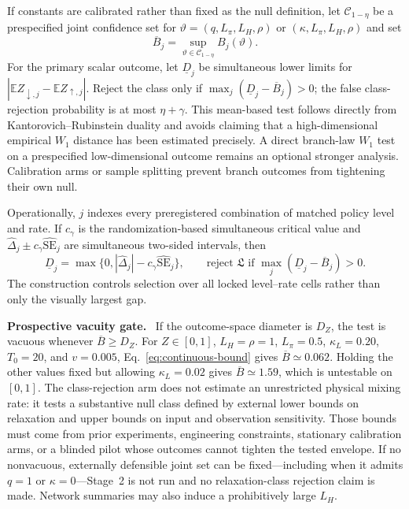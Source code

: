 \documentclass[10pt,a4paper]{article}
\newcommand{\E}{\mathbb{E}}
\newcommand{\inlinehead}[1]{\par\smallskip\noindent\textbf{#1}\ }
\begin{document}
If constants are calibrated rather than fixed as the null definition, let $\mathcal C_{1-\eta}$ be a prespecified joint confidence set for $\vartheta=(q,L_\pi,L_H,\rho)$ or $(\kappa,L_\pi,L_H,\rho)$ and set
\begin{equation}
\overline B_j=\sup_{\vartheta\in\mathcal C_{1-\eta}}B_j(\vartheta).
\label{eq:lag-envelope}
\end{equation}
For the primary scalar outcome, let $\underline D_j$ be simultaneous lower limits for $|\E Z_{\downarrow,j}-\E Z_{\uparrow,j}|$. Reject the class only if $\max_j(\underline D_j-\overline B_j)>0$; the false class-rejection probability is at most $\eta+\gamma$. This mean-based test follows directly from Kantorovich--Rubinstein duality and avoids claiming that a high-dimensional empirical $W_1$ distance has been estimated precisely. A direct branch-law $W_1$ test on a prespecified low-dimensional outcome remains an optional stronger analysis. Calibration arms or sample splitting prevent branch outcomes from tightening their own null.

Operationally, $j$ indexes every preregistered combination of matched policy level and rate. If $c_\gamma$ is the randomization-based simultaneous critical value and $\widehat\Delta_j\pm c_\gamma\widehat{\mathrm{SE}}_j$ are simultaneous two-sided intervals, then
\begin{equation}
\underline D_j=\max\{0,|\widehat\Delta_j|-c_\gamma\widehat{\mathrm{SE}}_j\},
\qquad
\text{reject }\mathfrak L\text{ if }\max_j(\underline D_j-\overline B_j)>0.
\label{eq:simultaneous-lower-bound}
\end{equation}
The construction controls selection over all locked level--rate cells rather than only the visually largest gap.

\inlinehead{Prospective vacuity gate.} If the outcome-space diameter is $D_Z$, the test is vacuous whenever $\overline B\geq D_Z$. For $Z\in[0,1]$, $L_H=\rho=1$, $L_\pi=0.5$, $\kappa_L=0.20$, $T_0=20$, and $v=0.005$, Eq.~\eqref{eq:continuous-bound} gives $\overline B\simeq0.062$. Holding the other values fixed but allowing $\kappa_L=0.02$ gives $\overline B\simeq1.59$, which is untestable on $[0,1]$. The class-rejection arm does not estimate an unrestricted physical mixing rate: it tests a substantive null class defined by external lower bounds on relaxation and upper bounds on input and observation sensitivity. Those bounds must come from prior experiments, engineering constraints, stationary calibration arms, or a blinded pilot whose outcomes cannot tighten the tested envelope. If no nonvacuous, externally defensible joint set can be fixed---including when it admits $q=1$ or $\kappa=0$---Stage~2 is not run and no relaxation-class rejection claim is made. Network summaries may also induce a prohibitively large $L_H$.
\end{document}
